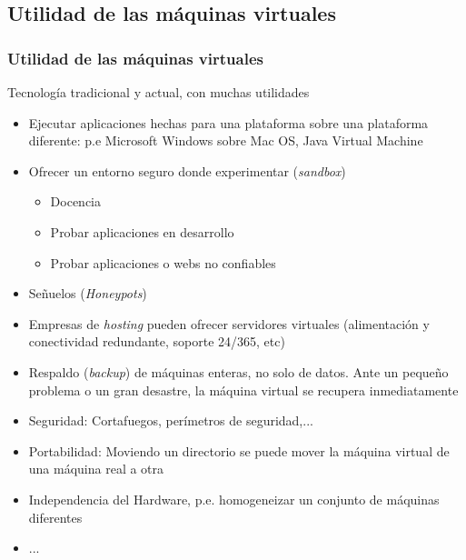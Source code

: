 \documentclass[ucs]{beamer}
\begin{document}
\subsection{Utilidad de las máquinas virtuales}
\begin{frame}[fragile]
\frametitle{Utilidad de las máquinas virtuales}
Tecnología tradicional y actual, con muchas utilidades
\begin{itemize}	
\item
Ejecutar aplicaciones hechas para una plataforma sobre una plataforma diferente: 
p.e Microsoft Windows sobre Mac OS, Java Virtual Machine
 
\item
Ofrecer un entorno seguro donde experimentar (\emph{sandbox})
\begin{itemize}	
\item
Docencia
\item
Probar aplicaciones en desarrollo
\item
Probar aplicaciones o webs no confiables
\end{itemize}
\item
Señuelos (\emph{Honeypots})
\item
Empresas de \emph{hosting} pueden ofrecer servidores virtuales (alimentación y conectividad
redundante, soporte 24/365, etc)


\end{itemize}
\end{frame}


\begin{frame}[fragile]
\begin{itemize}

\item
Respaldo (\emph{backup}) de máquinas enteras, no solo de datos. Ante un pequeño
problema o un gran desastre, la máquina virtual se recupera inmediatamente
\item
Seguridad: Cortafuegos, perímetros de seguridad,...
\item
Portabilidad: Moviendo un directorio se puede mover la máquina virtual
de una máquina real a otra
\item
Independencia del Hardware, p.e. homogeneizar un conjunto de máquinas diferentes
\item
...
\end{itemize}
\end{frame}
\end{document}
